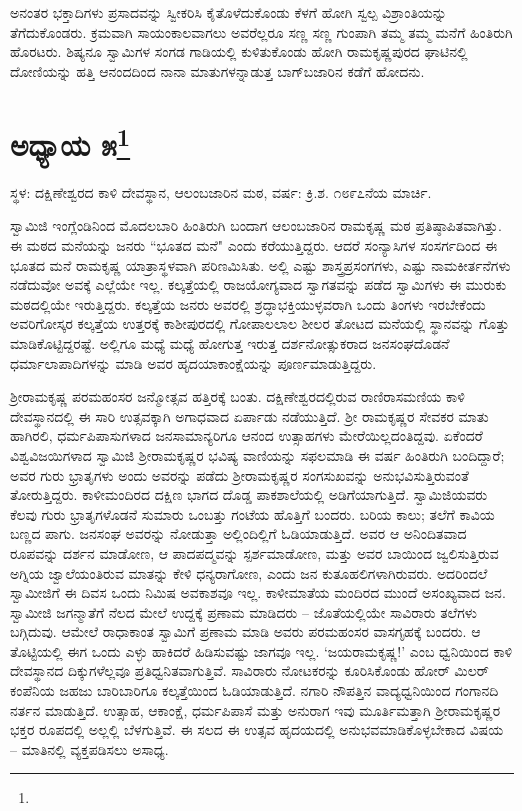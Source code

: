 ಅನಂತರ ಭಕ್ತಾದಿಗಳು ಪ್ರಸಾದವನ್ನು ಸ್ವೀಕರಿಸಿ ಕೈತೊಳೆದುಕೊಂಡು ಕೆಳಗೆ ಹೋಗಿ ಸ್ವಲ್ಪ ವಿಶ್ರಾಂತಿಯನ್ನು ತೆಗೆದುಕೊಂಡರು. ಕ್ರಮವಾಗಿ ಸಾಯಂಕಾಲವಾಗಲು ಅವರೆಲ್ಲರೂ ಸಣ್ಣ ಸಣ್ಣ ಗುಂಪಾಗಿ ತಮ್ಮ ತಮ್ಮ ಮನೆಗೆ ಹಿಂತಿರುಗಿ ಹೊರಟರು. ಶಿಷ್ಯನೂ ಸ್ವಾಮಿಗಳ ಸಂಗಡ ಗಾಡಿಯಲ್ಲಿ ಕುಳಿತುಕೊಂಡು ಹೋಗಿ ರಾಮಕೃಷ್ಣಪುರದ ಘಾಟಿನಲ್ಲಿ ದೋಣಿಯನ್ನು ಹತ್ತಿ ಆನಂದದಿಂದ ನಾನಾ ಮಾತುಗಳನ್ನಾಡುತ್ತ ಬಾಗ್‌ಬಜಾರಿನ ಕಡೆಗೆ ಹೋದನು.

\newpage

\chapter[ಅಧ್ಯಾಯ ೫]{ಅಧ್ಯಾಯ ೫\protect\footnote{}}

\centerline{ಸ್ಥಳ: ದಕ್ಷಿಣೇಶ್ವರದ ಕಾಳಿ ದೇವಸ್ಥಾನ, ಆಲಂಬಜಾರಿನ ಮಠ, ವರ್ಷ: ಕ್ರಿ.ಶ. ೧೮೯೭ನೆಯ ಮಾರ್ಚಿ.}

ಸ್ವಾಮಿಜಿ ಇಂಗ್ಲೆಂಡಿನಿಂದ ಮೊದಲಬಾರಿ ಹಿಂತಿರುಗಿ ಬಂದಾಗ ಆಲಂಬಜಾರಿನ ರಾಮಕೃಷ್ಣ ಮಠ ಪ್ರತಿಷ್ಠಾಪಿತವಾಗಿತ್ತು. ಈ ಮಠದ ಮನೆಯನ್ನು ಜನರು “ಭೂತದ ಮನೆ" ಎಂದು ಕರೆಯುತ್ತಿದ್ದರು. ಆದರೆ ಸಂನ್ಯಾಸಿಗಳ ಸಂಸರ್ಗದಿಂದ ಈ ಭೂತದ ಮನೆ ರಾಮಕೃಷ್ಣ ಯಾತ್ರಾಸ್ಥಳವಾಗಿ ಪರಿಣಮಿಸಿತು. ಅಲ್ಲಿ ಎಷ್ಟು ಶಾಸ್ತ್ರಪ್ರಸಂಗಗಳು, ಎಷ್ಟು ನಾಮಕೀರ್ತನೆಗಳು ನಡೆದುವೋ ಅವಕ್ಕೆ ಎಲ್ಲೆಯೇ ಇಲ್ಲ. ಕಲ್ಕತ್ತೆಯಲ್ಲಿ ರಾಜಯೋಗ್ಯವಾದ ಸ್ವಾಗತವನ್ನು ಪಡೆದ ಸ್ವಾಮಿಗಳು ಈ ಮುರುಕು ಮಠದಲ್ಲಿಯೇ ಇರುತ್ತಿದ್ದರು. ಕಲ್ಕತ್ತೆಯ ಜನರು ಅವರಲ್ಲಿ ಶ್ರದ್ಧಾಭಕ್ತಿಯುಳ್ಳವರಾಗಿ ಒಂದು ತಿಂಗಳು ಇರಬೇಕೆಂದು ಅವರಿಗೋಸ್ಕರ ಕಲ್ಕತ್ತೆಯ ಉತ್ತರಕ್ಕೆ ಕಾಶೀಪುರದಲ್ಲಿ ಗೋಪಾಲಲಾಲ ಶೀಲರ ತೋಟದ ಮನೆಯಲ್ಲಿ ಸ್ಥಾನವನ್ನು ಗೊತ್ತು ಮಾಡಿಕೊಟ್ಟಿದ್ದರಷ್ಟೆ. ಅಲ್ಲಿಗೂ ಮಧ್ಯೆ ಮಧ್ಯೆ ಹೋಗುತ್ತ ಇರುತ್ತ ದರ್ಶನೋತ್ಸುಕರಾದ ಜನಸಂಘದೊಡನೆ ಧರ್ಮಾಲಾಪಾದಿಗಳನ್ನು ಮಾಡಿ ಅವರ ಹೃದಯಾಕಾಂಕ್ಷೆಯನ್ನು ಪೂರ್ಣಮಾಡುತ್ತಿದ್ದರು.

ಶ‍್ರೀರಾಮಕೃಷ್ಣ ಪರಮಹಂಸರ ಜನ್ಮೋತ್ಸವ ಹತ್ತಿರಕ್ಕೆ ಬಂತು. ದಕ್ಷಿಣೇಶ್ವರದಲ್ಲಿರುವ ರಾಣಿರಾಸಮಣಿಯ ಕಾಳಿ ದೇವಸ್ಥಾನದಲ್ಲಿ ಈ ಸಾರಿ ಉತ್ಸವಕ್ಕಾಗಿ ಅಗಾಧವಾದ ಏರ್ಪಾಡು ನಡೆಯುತ್ತಿದೆ. ಶ‍್ರೀ ರಾಮಕೃಷ್ಣರ ಸೇವಕರ ಮಾತು ಹಾಗಿರಲಿ, ಧರ್ಮಪಿಪಾಸುಗಳಾದ ಜನಸಾಮಾನ್ಯರಿಗೂ ಆನಂದ ಉತ್ಸಾಹಗಳು ಮೇರೆಯಿಲ್ಲದಂತಿದ್ದವು. ಏಕೆಂದರೆ ವಿಶ್ವವಿಜಯಿಗಳಾದ ಸ್ವಾಮಿಜಿ ಶ‍್ರೀರಾಮಕೃಷ್ಣರ ಭವಿಷ್ಯ ವಾಣಿಯನ್ನು ಸಫಲಮಾಡಿ ಈ ವರ್ಷ ಹಿಂತಿರುಗಿ ಬಂದಿದ್ದಾರೆ; ಅವರ ಗುರು ಭ್ರಾತೃಗಳು ಅಂದು ಅವರನ್ನು ಪಡೆದು ಶ‍್ರೀರಾಮಕೃಷ್ಣರ ಸಂಗಸುಖವನ್ನು ಅನುಭವಿಸುತ್ತಿರುವಂತೆ ತೋರುತ್ತಿದ್ದರು. ಕಾಳೀಮಂದಿರದ ದಕ್ಷಿಣ ಭಾಗದ ದೊಡ್ಡ ಪಾಕಶಾಲೆಯಲ್ಲಿ ಅಡಿಗೆಯಾಗುತ್ತಿದೆ. ಸ್ವಾಮಿಜಿಯವರು ಕೆಲವು ಗುರು ಭ್ರಾತೃಗಳೊಡನೆ ಸುಮಾರು ಒಂಬತ್ತು ಗಂಟೆಯ ಹೊತ್ತಿಗೆ ಬಂದರು. ಬರಿಯ ಕಾಲು; ತಲೆಗೆ ಕಾವಿಯ ಬಣ್ಣದ ಪಾಗು. ಜನಸಂಘ ಅವರನ್ನು ನೋಡುತ್ತಾ ಅಲ್ಲಿಂದಿಲ್ಲಿಗೆ ಓಡಿಯಾಡುತ್ತಿದೆ. ಅವರ ಆ ಅನಿಂದಿತವಾದ ರೂಪವನ್ನು ದರ್ಶನ ಮಾಡೋಣ, ಆ ಪಾದಪದ್ಮವನ್ನು ಸ್ಪರ್ಶಮಾಡೋಣ, ಮತ್ತು ಅವರ ಬಾಯಿಂದ ಜ್ವಲಿಸುತ್ತಿರುವ ಅಗ್ನಿಯ ಜ್ವಾಲೆಯಂತಿರುವ ಮಾತನ್ನು ಕೇಳಿ ಧನ್ಯರಾಗೋಣ, ಎಂದು ಜನ ಕುತೂಹಲಿಗಳಾಗಿರುವರು. ಅದರಿಂದಲೆ ಸ್ವಾಮೀಜಿಗೆ ಈ ದಿವಸ ಒಂದು ನಿಮಿಷ ಅವಕಾಶವೂ ಇಲ್ಲ. ಕಾಳೀಮಾತೆಯ ಮಂದಿರದ ಮುಂದೆ ಅಸಂಖ್ಯವಾದ ಜನ. ಸ್ವಾಮೀಜಿ ಜಗನ್ಮಾತೆಗೆ ನೆಲದ ಮೇಲೆ ಉದ್ದಕ್ಕೆ ಪ್ರಣಾಮ ಮಾಡಿದರು – ಜೊತೆಯಲ್ಲಿಯೇ ಸಾವಿರಾರು ತಲೆಗಳು ಬಗ್ಗಿದುವು. ಆಮೇಲೆ ರಾಧಾಕಾಂತ ಸ್ವಾಮಿಗೆ ಪ್ರಣಾಮ ಮಾಡಿ ಅವರು ಪರಮಹಂಸರ ವಾಸಗೃಹಕ್ಕೆ ಬಂದರು. ಆ ತೊಟ್ಟಿಯಲ್ಲಿ ಈಗ ಒಂದು ಎಳ್ಳು ಹಾಕಿದರೆ ಹಿಡಿಸುವಷ್ಟು ಜಾಗವೂ ಇಲ್ಲ. ‘ಜಯರಾಮಕೃಷ್ಣ!’ ಎಂಬ ಧ್ವನಿಯಿಂದ ಕಾಳಿ ದೇವಸ್ಥಾನದ ದಿಕ್ಕುಗಳೆಲ್ಲವೂ ಪ್ರತಿಧ್ವನಿತವಾಗುತ್ತಿವೆ. ಸಾವಿರಾರು ನೋಟಕರನ್ನು ಕೂರಿಸಿಕೊಂಡು ಹೋರ್‌ ಮಿಲರ್ ಕಂಪೆನಿಯ ಜಹಜು ಬಾರಿಬಾರಿಗೂ ಕಲ್ಕತ್ತೆಯಿಂದ ಓಡಿಯಾಡುತ್ತಿದೆ. ನಗಾರಿ ನೌಪತ್ತಿನ ವಾದ್ಯಧ್ವನಿಯಿಂದ ಗಂಗಾನದಿ ನರ್ತನ ಮಾಡುತ್ತಿದೆ. ಉತ್ಸಾಹ, ಆಕಾಂಕ್ಷೆ, ಧರ್ಮಪಿಪಾಸೆ ಮತ್ತು ಅನುರಾಗ ಇವು ಮೂರ್ತಿಮತ್ತಾಗಿ ಶ‍್ರೀರಾಮಕೃಷ್ಣರ ಭಕ್ತರ ರೂಪದಲ್ಲಿ ಅಲ್ಲಲ್ಲಿ ಬೆಳಗುತ್ತಿವೆ. ಈ ಸಲದ ಈ ಉತ್ಸವ ಹೃದಯದಲ್ಲಿ ಅನುಭವಮಾಡಿಕೊಳ್ಳಬೇಕಾದ ವಿಷಯ – ಮಾತಿನಲ್ಲಿ ವ್ಯಕ್ತಪಡಿಸಲು ಅಸಾಧ್ಯ.


